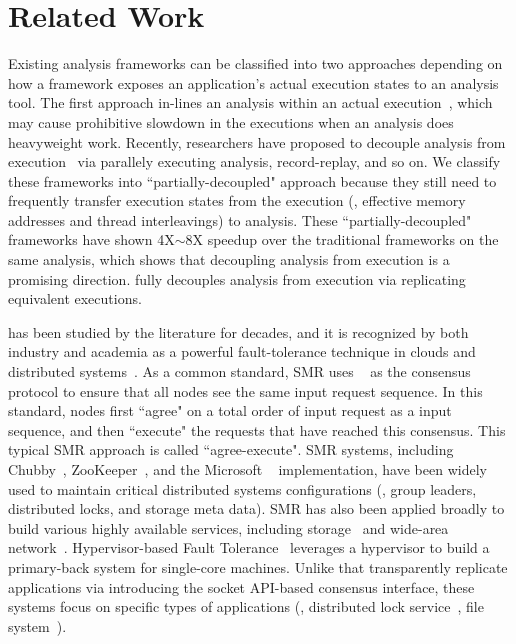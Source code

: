 \section{Related Work} \label{sec:related}

Existing analysis frameworks can be classified into two approaches depending 
on how a framework exposes an application's actual execution states to an 
analysis tool. The first approach in-lines an analysis within an 
actual execution~\cite{dynamorio, pin:pldi05, 
valgrind:pldi, lift:micro06, tsan}, which may cause prohibitive slowdown in the
executions when an analysis does heavyweight work. Recently, researchers have
proposed to 
decouple analysis from execution~\cite{decouple:usenix08, speck:asplos08, 
shadowreplica:ccs13, wester:parallelizing:asplos13, superpin, jungwoo:oopsla09} 
via parallely executing analysis, record-replay, and so on. We classify these
frameworks into ``partially-decoupled" approach because they still need to
frequently 
transfer execution states from the execution (\eg, effective memory addresses 
and thread interleavings) to analysis. These ``partially-decoupled" frameworks 
have shown 4X$\sim$8X speedup over the traditional frameworks on the same 
analysis, which shows that decoupling analysis from execution is a promising 
direction. \xxx fully decouples analysis from execution via replicating 
equivalent executions.

\smr has been studied by the literature for decades, and it is recognized by 
both industry and academia as a powerful fault-tolerance technique in clouds 
and distributed systems~\cite{lamportclock, smr:tutorial}. As a common 
standard, SMR uses \paxos~\cite{paxos} as the consensus protocol to ensure that 
all nodes see the same input request sequence. In this standard, nodes first 
``agree" on a total order of input request as a input sequence, and then 
``execute" the requests that have reached this consensus. This typical SMR 
approach is called ``agree-execute". SMR systems, including 
Chubby~\cite{chubby:osdi}, ZooKeeper~\cite{zookeeper}, and 
the Microsoft \paxos~\cite{paxos} implementation, have been widely used to 
maintain critical distributed systems configurations (\eg, group leaders, 
distributed locks, and storage meta data). SMR has also been applied broadly to 
build various highly available services, including 
storage~\cite{paxos:datastore} and wide-area network~\cite{mencius:osdi08}. 
Hypervisor-based Fault Tolerance~\cite{hft:sosp95} leverages a hypervisor to 
build a primary-back system for single-core machines. Unlike \xxx that 
transparently replicate applications via introducing the socket API-based 
consensus interface, these systems focus on specific types of applications 
(\eg, distributed lock service~\cite{chubby:osdi}, file 
system~\cite{zookeeper}).

